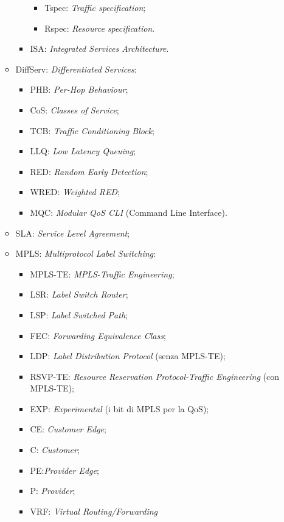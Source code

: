 \begin{itemize}
\begin{itemize}
\begin{itemize}
\begin{itemize}
\item{Tspec}: \emph{Traffic specification};
\item{Rspec}: \emph{Resource specification}.

\end{itemize}

\item{ISA}: \emph{Integrated Services Architecture}.

\end{itemize}

\item{DiffServ}: \emph{Differentiated Services}:

\begin{itemize}

\item{PHB}: \emph{Per-Hop Behaviour};
\item{CoS}: \emph{Classes of Service};
\item{TCB}: \emph{Traffic Conditioning Block};
\item{LLQ}: \emph{Low Latency Queuing};
\item{RED}: \emph{Random Early Detection};
\item{WRED}: \emph{Weighted RED};
\item{MQC}: \emph{Modular QoS CLI} (Command Line Interface).

\end{itemize}

\item{SLA}: \emph{Service Level Agreement};
\item{MPLS}: \emph{Multiprotocol Label Switching}:

\begin{itemize}

\item{MPLS-TE}: \emph{MPLS-Traffic Engineering};
\item{LSR}: \emph{Label Switch Router};
\item{LSP}: \emph{Label Switched Path};
\item{FEC}: \emph{Forwarding Equivalence Class};
\item{LDP}: \emph{Label Distribution Protocol} (senza MPLS-TE);
\item{RSVP-TE}: \emph{Resource Reservation Protocol-Traffic Engineering} (con MPLS-TE);
\item{EXP}: \emph{Experimental} (i bit di MPLS per la QoS);
\item{CE}: \emph{Customer Edge};
\item{C}: \emph{Customer};\
\item{PE}:\emph{Provider Edge};
\item{P}: \emph{Provider};
\item{VRF}: \emph{Virtual Routing/Forwarding}


\end{itemize}
\end{itemize}
\end{itemize}

